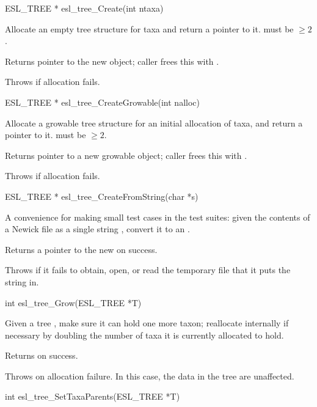 \begin{sreapi}
\hypertarget{func:esl_tree_Create()}
{\item[ESL\_TREE * esl\_tree\_Create(int ntaxa)]}

Allocate an empty tree structure for  taxa
and return a pointer to it.  must be $\geq 2$.

Returns pointer to the new  object; caller frees 
this with .

Throws  if allocation fails.


\hypertarget{func:esl_tree_CreateGrowable()}
{\item[ESL\_TREE * esl\_tree\_CreateGrowable(int nalloc)]}

Allocate a growable tree structure for an initial
allocation of  taxa, and return a pointer to it.
 must be $\geq 2$.

Returns pointer to a new growable  object; caller frees 
this with .

Throws  if allocation fails.


\hypertarget{func:esl_tree_CreateFromString()}
{\item[ESL\_TREE * esl\_tree\_CreateFromString(char *s)]}

A convenience for making small test cases in the test
suites: given the contents of a Newick file as a 
single string , convert it to an .

Returns a pointer to the new  on success.

Throws  if it fails to obtain, open, or read the
temporary file that it puts the string  in.


\hypertarget{func:esl_tree_Grow()}
{\item[int esl\_tree\_Grow(ESL\_TREE *T)]}

Given a tree , make sure it can hold one more taxon;
reallocate internally if necessary by doubling the
number of taxa it is currently allocated to hold.

Returns  on success.

Throws  on allocation failure. In this case, 
the data in the tree are unaffected.


\hypertarget{func:esl_tree_SetTaxaParents()}
{\item[int esl\_tree\_SetTaxaParents(ESL\_TREE *T)]}


\end{sreapi}
